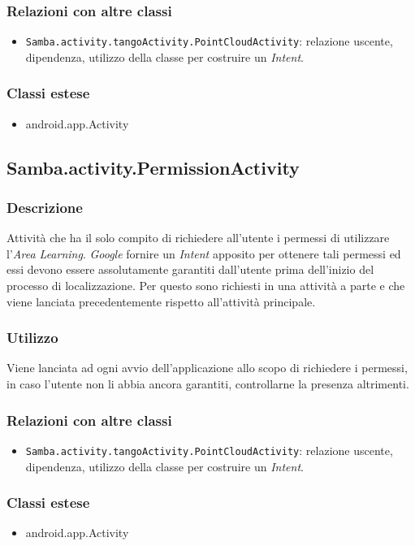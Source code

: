 \subsubsection{Relazioni con altre classi}
\begin{itemize}
	\item \texttt{Samba.activity.tangoActivity.PointCloudActivity}: relazione uscente, dipendenza, utilizzo della classe per costruire un \emph{Intent}.
\end{itemize}
\subsubsection{Classi estese}
\begin{itemize}
	\item android.app.Activity
\end{itemize}

\subsection{Samba.activity.PermissionActivity}
\subsubsection{Descrizione}
Attività che ha il solo compito di richiedere all'utente i permessi di utilizzare l'\emph{Area Learning}. \emph{Google} fornire un \emph{Intent} apposito per ottenere tali permessi ed essi devono essere assolutamente garantiti dall'utente prima dell'inizio del processo di localizzazione. Per questo sono richiesti in una attività a parte e che viene lanciata precedentemente rispetto all'attività principale.
\subsubsection{Utilizzo}
Viene lanciata ad ogni avvio dell'applicazione allo scopo di richiedere i permessi, in caso l'utente non li abbia ancora garantiti, controllarne la presenza altrimenti.
\subsubsection{Relazioni con altre classi}
\begin{itemize}
	\item \texttt{Samba.activity.tangoActivity.PointCloudActivity}: relazione uscente, dipendenza, utilizzo della classe per costruire un \emph{Intent}.
\end{itemize}
\subsubsection{Classi estese}
\begin{itemize}
	\item android.app.Activity
\end{itemize}

